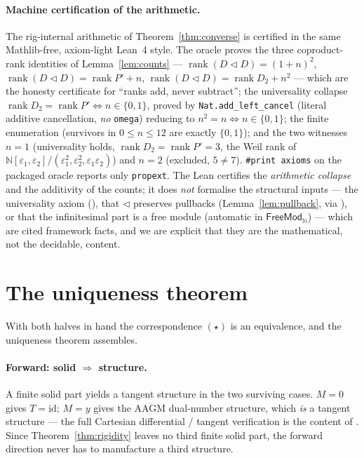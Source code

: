 \documentclass[11pt]{article}
\theoremstyle{definition}
\newcommand{\FreeMod}{\mathsf{FreeMod}}
\newcommand{\N}{\mathbb{N}}
\newcommand{\id}{\mathrm{id}}
\newcommand{\rank}{\operatorname{rank}}
\begin{document}
\paragraph{Machine certification of the arithmetic.}
The rig-internal arithmetic of Theorem~\ref{thm:converse} is certified in the same Mathlib-free,
axiom-light Lean~4 style. The oracle proves the three coproduct-rank identities of
Lemma~\ref{lem:counts} --- $\rank(D\lhd D)=(1+n)^2$, $\rank(D\lhd D)=\rank P'+n$,
$\rank(D\lhd D)=\rank D_2+n^2$ --- which are the honesty certificate for ``ranks add, never
subtract''; the universality collapse $\rank D_2=\rank P'\iff n\in\{0,1\}$, proved by
\texttt{Nat.add\_left\_cancel} (literal additive cancellation, \emph{no} \texttt{omega}) reducing to
$n^2=n\iff n\in\{0,1\}$; the finite enumeration (survivors in $0\le n\le12$ are exactly $\{0,1\}$);
and the two witnesses $n=1$ (universality holds, $\rank D_2=\rank P'=3$, the Weil rank of
$\N[\varepsilon_1,\varepsilon_2]/(\varepsilon_1^2,\varepsilon_2^2,\varepsilon_1\varepsilon_2)$) and
$n=2$ (excluded, $5\ne7$). \texttt{\#print axioms} on the packaged oracle reports only
\texttt{propext}. The Lean certifies the \emph{arithmetic collapse} and the additivity of the
counts; it does \emph{not} formalise the structural inputs --- the universality axiom
(\cite{CockettCruttwell2014}), that $\lhd$ preserves pullbacks (Lemma~\ref{lem:pullback}, via
\cite{GambinoKock2013}), or that the infinitesimal part is a free module (automatic in
$\FreeMod_\N$) --- which are cited framework facts, and we are explicit that they are the
mathematical, not the decidable, content.

\section{The uniqueness theorem}\label{sec:uniqueness}

With both halves in hand the correspondence $(\star)$ is an equivalence, and the uniqueness theorem
assembles.

\paragraph{Forward: solid $\Rightarrow$ structure.}
A finite solid part yields a tangent structure in the two surviving cases. $M=0$ gives $T=\id$;
$M=y$ gives the AAGM dual-number structure, which \emph{is} a tangent structure --- the full
Cartesian differential / tangent verification is the content of \cite{MacBethTangent}. Since
Theorem~\ref{thm:rigidity} leaves no third finite solid part, the forward direction never has to
manufacture a third structure.
\end{document}
